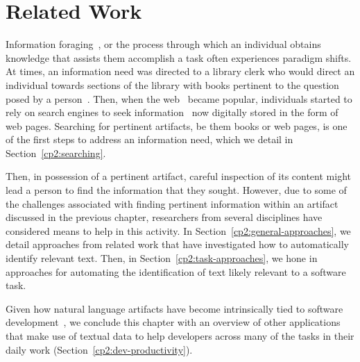 \setcounter{chapter}{1}


\chapter{Related Work}
\label{ch:related-work}



Information foraging~\cite{Pirolli1999}, or the process through which an individual 
obtains knowledge that assists them accomplish a task often experiences paradigm shifts. 
At times, 
an information need was directed to a library clerk 
who would direct an individual towards 
sections of the library with books pertinent to the question 
posed by a person~\cite{saracevic1975}.
Then, when the \acf{web}~\cite{berners1994web} became popular,
individuals started to rely on search engines 
to seek information~\cite{Page1999} now digitally stored in the form of web pages.
Searching for pertinent artifacts, be them books or web pages, 
is one of the first steps to address an information need,
which we detail in Section~\ref{cp2:searching}.


Then, in possession of a pertinent artifact, careful 
inspection of its content might lead a person 
to find the information that they sought. 
However, due to some of the challenges
associated with finding pertinent information within 
an artifact discussed in the previous chapter, researchers from several 
disciplines have considered means to help 
in this activity. 
In Section~\ref{cp2:general-approaches}, 
we detail approaches from related work
that have investigated how to automatically identify relevant text. 
Then, in Section~\ref{cp2:task-approaches}, 
we hone in approaches 
for automating the identification of text 
likely relevant to a software task.




Given how 
natural language artifacts have become intrinsically
tied to software development~\cite{umarji2008archetypal},
we conclude this chapter with an overview of 
other applications that make use of textual data
to help developers
across many of the tasks in their daily work (Section~\ref{cp2:dev-productivity}).


